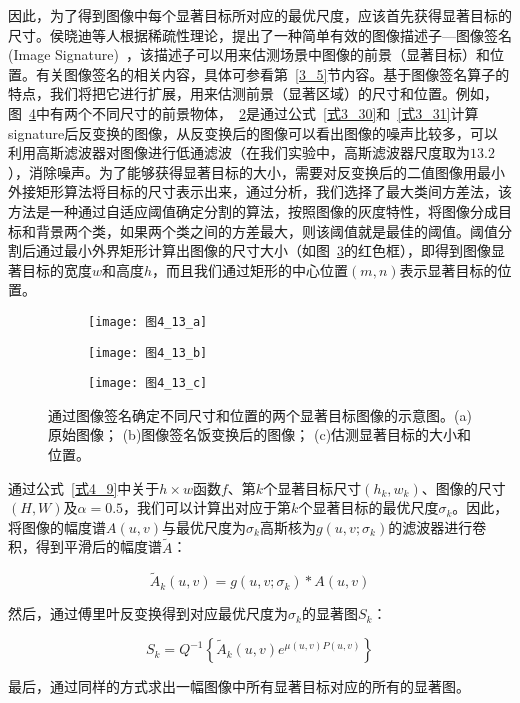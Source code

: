 因此，为了得到图像中每个显著目标所对应的最优尺度，应该首先获得显著目标的尺寸。侯晓迪等人根据稀疏性理论，提出了一种简单有效的图像描述子---图像签名(Image Signature)~\cite{HouXiaodiTPAMI2012Signature}，该描述子可以用来估测场景中图像的前景（显著目标）和位置。有关图像签名的相关内容，具体可参看第~\ref{3_5}节内容。基于图像签名算子的特点，我们将把它进行扩展，用来估测前景（显著区域）的尺寸和位置。例如，图~\ref{图4_13}中有两个不同尺寸的前景物体，~\ref{图4_13_b}是通过公式~\ref{式3_30}和~\ref{式3_31}计算signature后反变换的图像，从反变换后的图像可以看出图像的噪声比较多，可以利用高斯滤波器对图像进行低通滤波（在我们实验中，高斯滤波器尺度取为$13.2$），消除噪声。为了能够获得显著目标的大小，需要对反变换后的二值图像用最小外接矩形算法将目标的尺寸表示出来，通过分析，我们选择了最大类间方差法，该方法是一种通过自适应阈值确定分割的算法，按照图像的灰度特性，将图像分成目标和背景两个类，如果两个类之间的方差最大，则该阈值就是最佳的阈值。阈值分割后通过最小外界矩形计算出图像的尺寸大小（如图~\ref{图4_13_c}的红色框），即得到图像显著目标的宽度$w$和高度$h$，而且我们通过矩形的中心位置$(m,n)$表示显著目标的位置。
\begin{figure}[h]
  \centering%
  \begin{subfigure}{3cm}
    \texttt{[image: 图4\_13\_a]}
    \caption{}
  \label{图4_13_a}
  \end{subfigure}
  \hspace{4em}%
  \begin{subfigure}{0.2\textwidth}
    \texttt{[image: 图4\_13\_b]}
    \caption{}
  \label{图4_13_b}
  \end{subfigure}
  \hspace{4em}%
  \begin{subfigure}{0.25\textwidth}
    \texttt{[image: 图4\_13\_c]}
    \caption{}
  \label{图4_13_c}
  \end{subfigure}
  \caption{通过图像签名确定不同尺寸和位置的两个显著目标图像的示意图。(a)原始图像； (b)图像签名饭变换后的图像； (c)估测显著目标的大小和位置。}
  \label{图4_13}
\end{figure}

通过公式~\ref{式4_9}中关于$h\times w$函数$f$、第$k$个显著目标尺寸$(h_{k},w_{k})$、图像的尺寸$(H,W)$及$\alpha=0.5$，我们可以计算出对应于第$k$个显著目标的最优尺度$\sigma_{k}$。因此，将图像的幅度谱$A(u,v)$与最优尺度为$\sigma_{k}$高斯核为$g(u,v;\sigma_{k})$的滤波器进行卷积，得到平滑后的幅度谱$\tilde{A}$： 
\begin{linenomath}
\begin{equation}
\tilde{A}_k(u,v)=g(u,v;\sigma_k)\ast A(u,v)
\label{式4_25}
\end{equation}
\end{linenomath}
然后，通过傅里叶反变换得到对应最优尺度为$\sigma_{k}$的显著图$S_{k}$：
\begin{linenomath}
\begin{equation}
S_k=Q^{-1}\left\{\tilde{A}_k(u,v)e^{\mu(u,v)P(u,v)}\right\}
\label{式4_26}
\end{equation}
\end{linenomath}
最后，通过同样的方式求出一幅图像中所有显著目标对应的所有的显著图。

